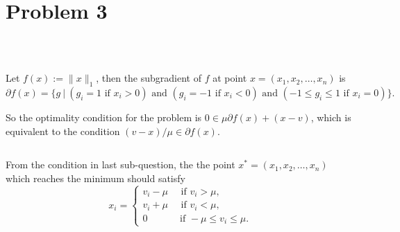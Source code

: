 \section{Problem 3}~\label{sec:prob3}

\subsection{} %

Let $f(x):=\|x\|_1$,
then the subgradient of $f$ at point $x=(x_1,x_2,\dots,x_n)$ is
\begin{equation}
\partial f(x)=\{g~|~(g_i = 1 \text{ if } x_i>0)
\text{ and } (g_i = -1  \text{ if } x_i<0)
\text{ and } (-1\le g_i \le 1  \text{ if } x_i=0)
\}.
\end{equation}

So the optimality condition for the problem is
$0\in \mu\partial f(x) + (x-v)$,
which is equivalent to the condition $(v-x)/\mu \in\partial f(x)$.

\subsection{} %

From the condition in last sub-question,
the the point $x^*=(x_1,x_2,\dots,x_n)$
which reaches the minimum should satisfy
\begin{equation}
x_i=
\begin{cases}
v_i-\mu \quad \text{ if } v_i> \mu,\\
v_i+\mu \quad \text{ if } v_i< \mu,\\
0  \quad \quad \quad \text{ if } -\mu\le v_i\le \mu.
\end{cases}
\end{equation}
